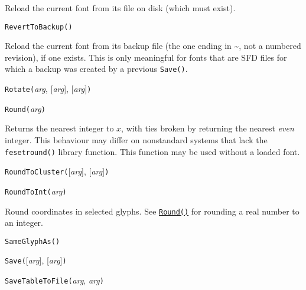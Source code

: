 Reload the current font from its file on disk (which must exist).



\texttt{RevertToBackup()}

Reload the current font from its backup file (the one ending in
\textasciitilde, not a numbered revision), if one exists.  This is only
meaningful for fonts that are SFD files for which a backup was created by a
previous \texttt{Save()}.



\texttt{Rotate(}\textit{arg}, [\textit{arg}], [\textit{arg}]\texttt{)}



\texttt{Round(}\textit{arg}\texttt{)}

Returns the nearest integer to $x$, with ties broken by returning the
nearest \emph{even} integer.  This behaviour may differ on nonstandard
systems that lack the \texttt{fesetround()} library function.
This function may be used without a loaded font.



\texttt{RoundToCluster(}[\textit{arg}], [\textit{arg}]\texttt{)}



\texttt{RoundToInt(}\textit{arg}\texttt{)}

Round coordinates in selected glyphs.  See
\hyperref[func:Round]{\texttt{Round()}} for rounding a
real number to an integer.



\texttt{SameGlyphAs(}\texttt{)}



\texttt{Save(}[\textit{arg}], [\textit{arg}]\texttt{)}



\texttt{SaveTableToFile(}\textit{arg}, \textit{arg}\texttt{)}

